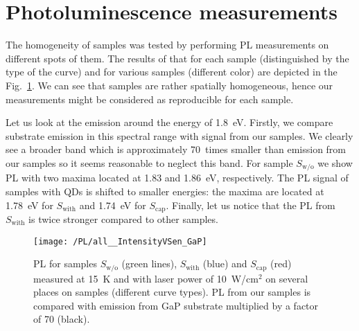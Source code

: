 \newpage
\section{Photoluminescence measurements}

The homogeneity of samples was tested by performing PL measurements on different spots of them. The results of that for each sample (distinguished by the type of the curve) and for various samples (different color) are depicted in the Fig.~\ref{fig:PL_homogenity}. We can see that samples are rather spatially homogeneous, hence our measurements might be considered as reproducible for each sample. %

Let us look at the emission around the energy of 1.8~eV. Firstly, we compare substrate emission in this spectral range with signal from our samples. We clearly see a broader band which is approximately 70~times smaller than emission from our samples so it seems reasonable to neglect this band. For sample $S_\mathrm{w/o}$ we show PL with two maxima located at 1.83 and 1.86~eV, respectively. The PL signal of samples with QDs is shifted to smaller energies: the maxima are located at 1.78~eV for $S_\mathrm{with}$ and 1.74~eV for $S_\mathrm{cap}$. Finally, let us notice that the PL from $S_\mathrm{with}$ is twice stronger compared to other samples.
\begin{figure}
	\centering
	\texttt{[image: /PL/all\_\_IntensityVSen\_GaP]}
	\caption{PL for samples $S_\mathrm{w/o}$ (green lines), $S_\mathrm{with}$ (blue) and $S_\mathrm{cap}$ (red) measured at 15~K and with laser power of 10~W/cm$^2$ on several places on samples (different curve types). PL from our samples is compared with emission from GaP substrate multiplied by a factor of 70 (black).}
	\label{fig:PL_homogenity}
\end{figure}

